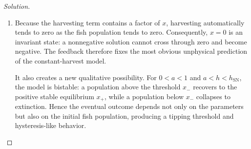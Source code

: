 \documentclass[12pt]{amsart}
\theoremstyle{conjecture}
\theoremstyle{definition}
\theoremstyle{question}
\theoremstyle{theorem}
\newenvironment{solution}
{\begin{proof}[Solution]}
{\end{proof}}
\begin{document}
\begin{enumerate}
\begin{solution}
\begin{enumerate}[label=(\alph*)]
    \item Because the harvesting term contains a factor of $x$, harvesting automatically tends to
    zero as the fish population tends to zero. Consequently, $x=0$ is an invariant state: a
    nonnegative solution cannot cross through zero and become negative. The feedback therefore fixes
    the most obvious unphysical prediction of the constant-harvest model.

    It also creates a new qualitative possibility. For $0<a<1$ and
    $a<h<h_{\mathrm{SN}}$, the model is bistable: a population above the threshold $x_-$ recovers to
    the positive stable equilibrium $x_+$, while a population below $x_-$ collapses to extinction.
    Hence the eventual outcome depends not only on the parameters but also on the initial fish
    population, producing a tipping threshold and hysteresis-like behavior.
            \end{enumerate}
        \end{solution}
    \end{enumerate}
\end{document}
